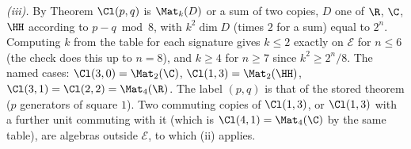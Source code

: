 \emph{(iii).} By Theorem  $\Cl(p,q)$ is $\Mat_{k}(D)$ or a sum of two copies, $D$ one of $\R$, $\C$, $\HH$ according to $p - q \bmod 8$, with $k^{2}\dim D$ (times $2$ for a sum) equal to $2^{n}$. Computing $k$ from the table for each signature gives $k \le 2$ exactly on $\mathcal{E}$ for $n \le 6$ (the check does this up to $n = 8$), and $k \ge 4$ for $n \ge 7$ since $k^{2} \ge 2^{n}/8$. The named cases: $\Cl(3,0) = \Mat_{2}(\C)$, $\Cl(1,3) = \Mat_{2}(\HH)$, $\Cl(3,1) = \Cl(2,2) = \Mat_{4}(\R)$. The label $(p,q)$ is that of the stored theorem ($p$ generators of square $1$). Two commuting copies of $\Cl(1,3)$, or $\Cl(1,3)$ with a further unit commuting with it (which is $\Cl(4,1) = \Mat_{4}(\C)$ by the same table), are algebras outside $\mathcal{E}$, to which (ii) applies.
